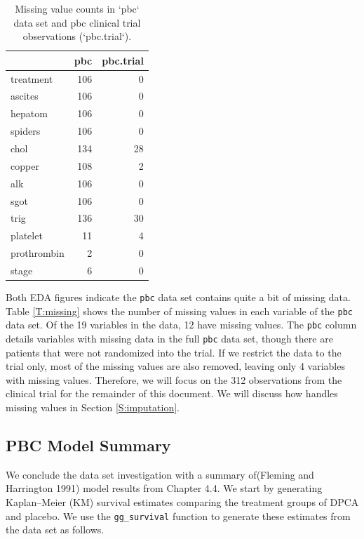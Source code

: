 \documentclass[article, nojss]{jss}
\begin{document}
\begin{table}

\caption{\label{tab:missing}Missing value counts in `pbc` data set and pbc clinical trial observations (`pbc.trial`).}
\centering
\begin{tabular}[t]{lrr}
\toprule
  & pbc & pbc.trial\\
\midrule
treatment & 106 & 0\\
ascites & 106 & 0\\
hepatom & 106 & 0\\
spiders & 106 & 0\\
chol & 134 & 28\\
\addlinespace
copper & 108 & 2\\
alk & 106 & 0\\
sgot & 106 & 0\\
trig & 136 & 30\\
platelet & 11 & 4\\
\addlinespace
prothrombin & 2 & 0\\
stage & 6 & 0\\
\bottomrule
\end{tabular}
\end{table}

Both EDA figures indicate the \texttt{pbc} data set contains quite a bit
of missing data. Table \ref{T:missing} shows the number of missing
values in each variable of the \texttt{pbc} data set. Of the 19
variables in the data, 12 have missing values. The \texttt{pbc} column
details variables with missing data in the full \texttt{pbc} data set,
though there are patients that were not randomized into the trial. If we
restrict the data to the trial only, most of the missing values are also
removed, leaving only 4 variables with missing values. Therefore, we
will focus on the 312 observations from the clinical trial for the
remainder of this document. We will discuss how 
handles missing values in Section \ref{S:imputation}.

\subsection{PBC Model Summary}\label{pbc-model-summary}

We conclude the data set investigation with a summary of(Fleming and
Harrington 1991) model results from Chapter 4.4. We start by generating
Kaplan--Meier (KM) survival estimates comparing the treatment groups of
DPCA and placebo. We use the  \texttt{gg\_survival}
function to generate these estimates from the data set as follows.
\end{document}
